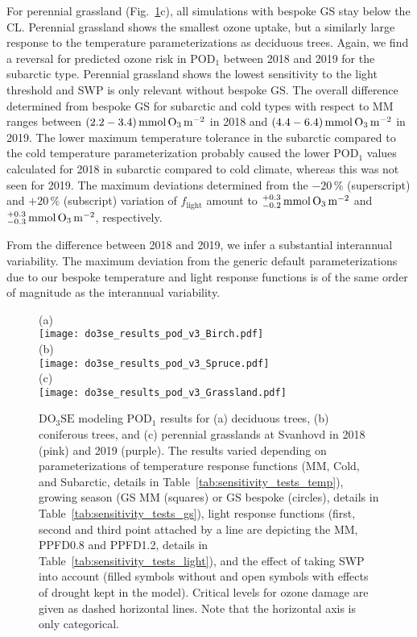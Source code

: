 \documentclass[bg, manuscript]{copernicus}
\begin{document}
For perennial grassland (Fig.~\ref{fig:pody_rel}c), all simulations with bespoke GS stay below the CL. Perennial grassland shows the smallest ozone uptake, but a similarly large response to the temperature parameterizations as deciduous trees. Again, we find a reversal for predicted ozone risk in $\mathrm{POD_1}$ between 2018 and 2019 for the subarctic type. Perennial grassland shows the lowest sensitivity to the light threshold and SWP is only relevant without bespoke GS. The overall difference determined from bespoke GS for subarctic and cold types with respect to MM ranges between $(2.2-3.4)\,\unit{mmol\,\chem{O_3}\,m^{-2}}$ in 2018 and $(4.4-6.4)\,\unit{mmol\,\chem{O_3}\,m^{-2}}$ in 2019. The lower maximum temperature tolerance in the subarctic compared to the cold temperature parameterization probably caused the lower $\mathrm{POD_1}$ values calculated for 2018 in subarctic compared to cold climate, whereas this was not seen for 2019. The maximum deviations determined from the $-20\,\unit{\%}$ (superscript) and $+20\,\unit{\%}$ (subscript) variation of $f_\mathrm{light}$ amount to $^{+0.3}_{-0.2}\,\unit{mmol\,\chem{O_3}\,m^{-2}}$ and $^{+0.3}_{-0.3}\,\unit{mmol\,\chem{O_3}\,m^{-2}}$, respectively.

From the difference between 2018 and 2019, we infer a substantial interannual variability. The maximum deviation from the generic default parameterizations due to our bespoke temperature and light response functions is of the same order of magnitude as the interannual variability.

\begin{figure}[t]
  \centering
  (a)\\
  \texttt{[image: do3se\_results\_pod\_v3\_Birch.pdf]}\\
  (b)\\
  \texttt{[image: do3se\_results\_pod\_v3\_Spruce.pdf]}\\
  (c)\\
  \texttt{[image: do3se\_results\_pod\_v3\_Grassland.pdf]}
  \caption{$\mathrm{DO_3SE}$ modeling $\mathrm{POD_1}$ results for (a) deciduous trees, (b) coniferous trees, and (c) perennial grasslands at Svanhovd in 2018 (pink) and 2019 (purple). The results varied depending on parameterizations of temperature response functions (MM, Cold, and Subarctic, details in Table~\ref{tab:sensitivity_tests_temp}), growing season (GS MM (squares) or GS bespoke (circles), details in Table~\ref{tab:sensitivity_tests_gs}), light response functions (first, second and third point attached by a line are depicting the MM, PPFD0.8 and PPFD1.2, details in Table~\ref{tab:sensitivity_tests_light}), and the effect of taking SWP into account (filled symbols without and open symbols with effects of drought kept in the model). Critical levels for ozone damage \citep{ICP:MappingManual2017,ESPR:Hayes2021} are given as dashed horizontal lines. Note that the horizontal axis is only categorical.}
  \label{fig:pody_rel}
\end{figure}
\end{document}
